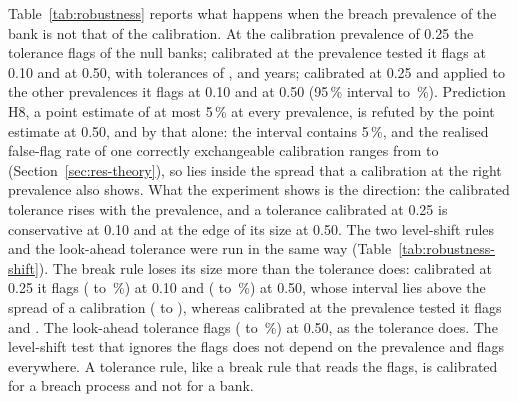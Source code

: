 

Table~\ref{tab:robustness} reports what happens when the breach prevalence of the bank is not that of the calibration. At the calibration prevalence of 0.25 the tolerance flags \fitNullBTol{} of the null banks; calibrated at the prevalence tested it flags \fitNullATol{} at 0.10 and \fitNullCTol{} at 0.50, with tolerances of \deltaA{}, \deltaB{} and \deltaC{} years; calibrated at 0.25 and applied to the other prevalences it flags \fitMisATol{} at 0.10 and \fitMisCTol{} at 0.50 (95\,\% interval \fitMisCTolLo{} to \fitMisCTolHi{}\,\%). Prediction H8, a point estimate of at most 5\,\% at every prevalence, is refuted by the point estimate at 0.50, and by that alone: the interval contains 5\,\%, and the realised false-flag rate of one correctly exchangeable calibration ranges from \confLo{} to \confHi{} (Section~\ref{sec:res-theory}), so \fitMisCTol{} lies inside the spread that a calibration at the right prevalence also shows. What the experiment shows is the direction: the calibrated tolerance rises with the prevalence, and a tolerance calibrated at 0.25 is conservative at 0.10 and at the edge of its size at 0.50. The two level-shift rules and the look-ahead tolerance were run in the same way (Table~\ref{tab:robustness-shift}). The break rule loses its size more than the tolerance does: calibrated at 0.25 it flags \fitMisAShiftB{} (\fitMisAShiftBLo{} to \fitMisAShiftBHi{}\,\%) at 0.10 and \fitMisCShiftB{} (\fitMisCShiftBLo{} to \fitMisCShiftBHi{}\,\%) at 0.50, whose interval lies above the spread of a calibration (\confLo{} to \confHi{}), whereas calibrated at the prevalence tested it flags \fitNullAShiftB{} and \fitNullCShiftB{}. The look-ahead tolerance flags \fitMisCTolLa{} (\fitMisCTolLaLo{} to \fitMisCTolLaHi{}\,\%) at 0.50, as the tolerance does. The level-shift test that ignores the flags does not depend on the prevalence and flags \fitMisCShift{} everywhere. A tolerance rule, like a break rule that reads the flags, is calibrated for a breach process and not for a bank.

